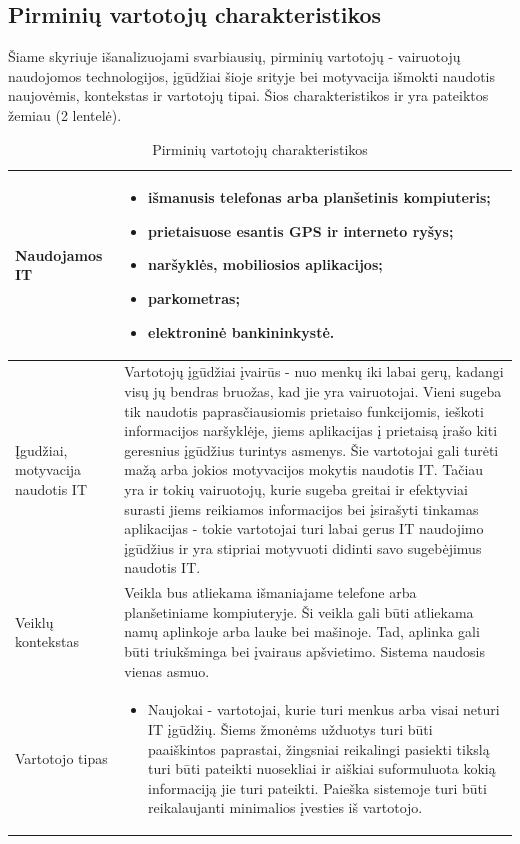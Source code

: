 \documentclass{VUMIFPSkursinis}
\begin{document}
\subsection{Pirminių vartotojų charakteristikos}

Šiame skyriuje išanalizuojami svarbiausių, pirminių vartotojų - vairuotojų naudojomos technologijos, įgūdžiai šioje srityje bei motyvacija išmokti naudotis naujovėmis, kontekstas ir vartotojų tipai. Šios charakteristikos ir yra pateiktos žemiau (2 lentelė).
\begin{table}[H]\footnotesize
  \centering
  \caption{Pirminių vartotojų charakteristikos}
  {\begin{tabular}{|p{}|p{}|} 
	\hline
	Naudojamos IT  & \begin{itemize}
						  \item išmanusis telefonas arba planšetinis kompiuteris;
						  \item	prietaisuose esantis GPS ir interneto ryšys;
						  \item	naršyklės, mobiliosios aplikacijos;
						  \item	parkometras;
						  \item	elektroninė bankininkystė.
					  \end{itemize}
					  \\
	\hline
    Įgudžiai, motyvacija naudotis IT  & Vartotojų įgūdžiai įvairūs - nuo menkų iki labai gerų, kadangi visų jų bendras bruožas, kad jie yra vairuotojai. Vieni sugeba tik naudotis paprasčiausiomis prietaiso funkcijomis, ieškoti informacijos naršyklėje, jiems aplikacijas į prietaisą įrašo kiti geresnius įgūdžius turintys asmenys. Šie vartotojai gali turėti mažą arba jokios motyvacijos mokytis naudotis IT. Tačiau yra ir tokių vairuotojų, kurie sugeba greitai ir efektyviai surasti jiems reikiamos informacijos bei įsirašyti tinkamas aplikacijas - tokie vartotojai turi labai gerus IT naudojimo įgūdžius ir yra stipriai motyvuoti didinti savo sugebėjimus naudotis IT.   \\
	\hline
    Veiklų kontekstas	& Veikla bus atliekama išmaniajame telefone arba planšetiniame kompiuteryje. Ši veikla gali būti atliekama namų aplinkoje arba lauke bei mašinoje. Tad, aplinka gali būti triukšminga bei įvairaus apšvietimo. Sistema naudosis vienas asmuo.     	    		  \\
	\hline
    Vartotojo tipas 	 & \begin{itemize}
							  \item Naujokai - vartotojai, kurie turi menkus arba visai neturi IT įgūdžių. Šiems žmonėms užduotys turi būti paaiškintos paprastai, žingsniai reikalingi pasiekti tikslą turi būti pateikti nuosekliai ir aiškiai suformuluota kokią informaciją jie turi pateikti. Paieška sistemoje turi būti reikalaujanti minimalios įvesties iš vartotojo.


\end{itemize}
\end{tabular}}
\end{table}
\end{document}
